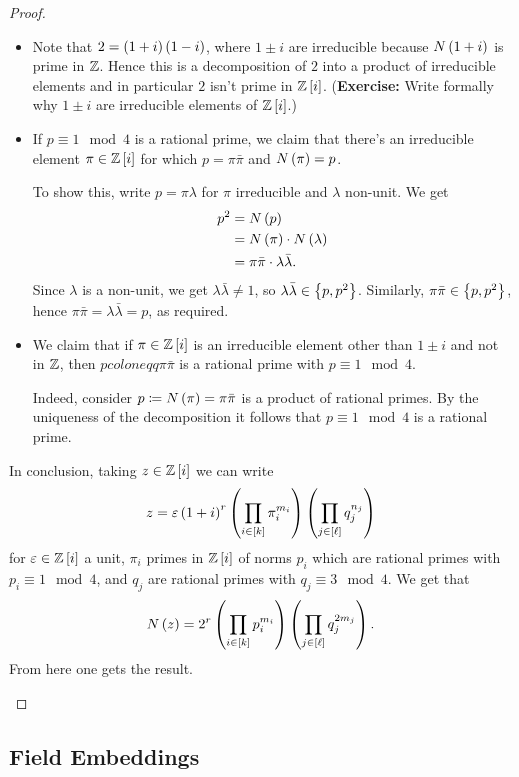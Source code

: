 \documentclass[11pt]{article}
\begin{document}
\begin{proof}
\begin{itemize}
\begin{itemize}
\item Note that $2 = \left( 1+i \right)\left( 1-i \right)$, where $1 \pm i$ are irreducible because $N\left( 1+i \right)$ is prime in $\mathbb{Z}$. Hence this is a decomposition of $2$ into a product of irreducible elements and in particular $2$ isn't prime in $\mathbb{Z}\left[ i \right]$. (\textbf{Exercise:} Write formally why $1 \pm i$ are irreducible elements of $\mathbb{Z}\left[ i \right]$.)

\item If $p \equiv 1 \mod{4}$ is a rational prime, we claim that there's an irreducible element $\pi \in \mathbb{Z}\left[ i \right]$ for which $p = \pi \bar{\pi}$ and $N\left( \pi \right) = p$.

To show this, write $p = \pi \lambda$ for $\pi$ irreducible and $\lambda$ non-unit. We get
\begin{align*}
p^2 &= N\left( p \right)
\\&= N\left( \pi \right) \cdot N\left( \lambda \right)
\\&= \pi \bar{\pi} \cdot \lambda \bar{\lambda} \text{.}
\end{align*}
Since $\lambda$ is a non-unit, we get $\lambda \bar{\lambda} \neq 1$, so $\lambda \bar{\lambda} \in \set{p, p^2}$. Similarly, $\pi \bar{\pi} \in \set{p, p^2}$, hence $\pi \bar{\pi} = \lambda \bar{\lambda} = p$, as required.

\item We claim that if $\pi \in \mathbb{Z}\left[ i \right]$ is an irreducible element other than $1 \pm i$ and not in $\mathbb{Z}$, then $p coloneqq \pi \bar{\pi}$ is a rational prime with $p \equiv 1 \mod{4}$.

Indeed, consider $p \coloneqq N\left( \pi \right) = \pi \bar{\pi}$ is a product of rational primes. By the uniqueness of the decomposition it follows that $p \equiv 1 \mod{4}$ is a rational prime.
\end{itemize}

In conclusion, taking $z \in \mathbb{Z}\left[ i \right]$ we can write
\[z = \varepsilon \left( 1 + i \right)^r \left( \prod_{i \in [k]} \pi_i^{m_i} \right) \left( \prod_{j \in \left[ \ell \right]} q_j^{n_j} \right)\]
for $\varepsilon \in \mathbb{Z}\left[ i \right]$ a unit, $\pi_i$ primes in $\mathbb{Z}\left[ i \right]$ of norms $p_i$ which are rational primes with $p_i \equiv 1 \mod{4}$, and $q_j$ are rational primes with $q_j \equiv 3 \mod{4}$.
We get that
\[N\left( z \right) = 2^r \left( \prod_{i \in [k]} p_i^{m_i} \right) \left( \prod_{j \in \left[ \ell \right]} q_j^{2 m_j} \right) \text{.}\]
From here one gets the result.
\end{itemize}
\end{proof}

\subsection{Field Embeddings}
\end{document}
